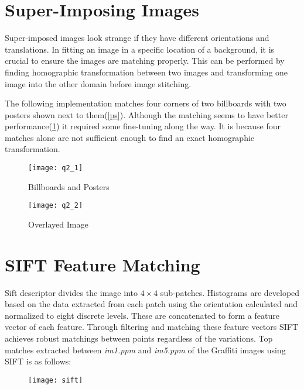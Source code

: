 \section{Super-Imposing Images}
Super-imposed images look strange if they have different orientations and translations. In fitting an image in a specific location of a background, it is crucial to ensure the images are matching properly.  This can be performed by finding homographic transformation between two images and transforming one image into the other domain before image stitching.
\par
The following implementation matches four corners of two billboards with two posters shown next to them(\ref{ps}).  Although the matching seems to have better performance(\ref{rst_1}) it required some fine-tuning along the way. It is because four matches alone are not sufficient enough to find an exact homographic transformation.

\begin{figure}[h]
    \begin{center}
        \begin{minipage}{.65\textwidth}
            \texttt{[image: q2\_1]}
            \caption{Billboards and Posters}
            \label{ps}
        \end{minipage}
        \begin{minipage}{.65\textwidth}
            \texttt{[image: q2\_2]}
            \caption{Overlayed Image}
            \label{rst_1}
        \end{minipage}
    \end{center}
\end{figure}


\section{SIFT Feature Matching}
Sift descriptor divides the image into $4\times 4$ sub-patches. Histograms are developed based on the data extracted from each patch using the orientation calculated and normalized to eight discrete levels. These are concatenated to form a feature vector of each feature. Through filtering and matching these feature vectors SIFT achieves robust matchings between points regardless of the variations. Top matches extracted between \textit{im1.ppm} and \textit{im5.ppm} of the Graffiti  images using SIFT is as follows:
\begin{figure}[h]
    \begin{center}
        \texttt{[image: sift]}
    \end{center}
\end{figure}